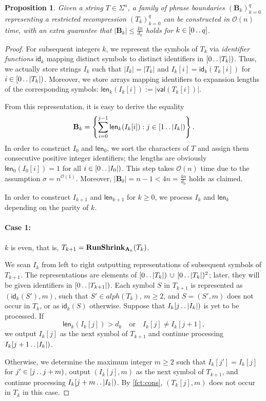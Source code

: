 \documentclass[a4paper]{article}
\newtheorem{proposition}[theorem]{Proposition}
\theoremstyle{definition}
\theoremstyle{remark}
\newcommand{\B}{\mathbf{B}}
\newcommand{\dd}{\mathinner{\ldotp\ldotp}}
\newcommand{\val}{\mathsf{val}}
\newcommand{\aalph}{\mathit{alph}}
\newcommand{\Oh}{\mathcal{O}}
\newcommand{\id}{\mathsf{id}}
\newcommand{\len}{\mathsf{len}}
\begin{document}
\begin{proposition}\label{lem:recompr2}
  Given a string $T\in \Sigma^n$, a family
  of phrase boundaries $(\B_k)_{k=0}^q$ representing a restricted recompression $(T_k)_{k=0}^q$ can be constructed in $\Oh(n)$ time,
  with an extra guarantee that $|\B_k| \le \frac{4n}{d_{k}}$ holds for $k\in [0 \dd q]$.
\end{proposition}
\begin{proof}
For subsequent integers $k$, we represent the symbols of $T_k$ via \emph{identifier functions} $\id_k$
mapping distinct symbols to distinct identifiers in $[0\dd |T_k|)$.
Thus, we actually store strings $I_k$ such that $|I_k|=|T_k|$ and $I_k[i]=\id_k(T_k[i])$ for $i\in [0\dd |T_k|)$.
Moreover, we store arrays mapping identifiers to expansion lengths of 
the corresponding symbols: $\len_k(I_k[i]):=|\val(T_k[i])|$. 

From this representation, it is easy to derive the equality
\[\B_k = \left\{\sum_{i=0}^{j-1} \len_k(I_k[i]) : j\in[1\dd |I_k|)\right\}.\]
In order to construct $I_0$ and $\len_0$, we sort the characters of $T$ and assign them consecutive positive integer identifiers;
the lengths are obviously $\len_0(I_0[i])=1$ for all $i \in [0 \dd |I_0|)$.
This step takes $\Oh(n)$ time due to the assumption $\sigma = n^{\Oh(1)}$.
Moreover, $|\B_0| = n-1 < 4n = \frac{4n}{d_0}$ holds as claimed.

In order to construct $I_{k+1}$ and $\len_{k+1}$ for $k\ge 0$, we process $I_{k}$ and $\len_{k}$
depending on the parity of $k$.

\paragraph{Case 1:} $k$ is even, that is, $T_{k+1}=\mathsf{\mathbf{RunShrink}}_{\mathbf{A}_{k}}(T_{k})$.

We scan $I_{k}$ from left to right outputting representations of subsequent symbols of $T_{k+1}$.
The representations are elements of $[0\dd |T_{k}|)\,\cup\, [0\dd |T_{k}|)^2$; later, they will be given identifiers in $[0 \dd |T_{k+1}|)$.
Each symbol $S$ in $T_{k+1}$ is represented as $(\id_{k}(S'),m)$, such that $S' \in \aalph(T_{k})$, $m \ge 2$, and $S=(S',m)$ does not occur in $T_{k}$, or as $\id_{k}(S)$ otherwise.
Suppose that $I_{k}[j\dd |I_{k}|)$ is yet to be processed.
If \[\len_{k}(I_{k}[j]) > d_{k}\quad\text{or}\quad I_{k}[j]\ne I_{k}[j+1],\]
we output $I_{k}[j]$ as the next symbol of $T_{k+1}$ and continue processing $I_{k}[j+1\dd |I_{k}|)$.

Otherwise, we determine the maximum integer $m\ge 2$ such that $I_{k}[j']=I_{k}[j]$ for $j'\in [j\dd j+m)$,
output $(I_{k}[j],m)$ as the next symbol of $T_{k+1}$, and continue processing $I_{k}[j+m\dd |I_{k}|)$.
By \cref{fct:cons}, $(T_{k}[j],m)$ does not occur in $T_{k}$ in this case.


\end{proof}
\end{document}
